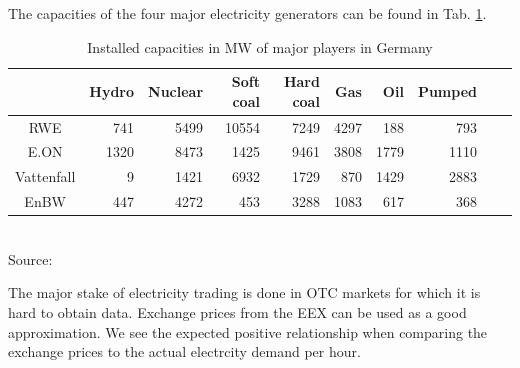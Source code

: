 The capacities of the four major electricity generators can be found in Tab. \ref{tab:majorcapacities}.

\begin{table}[htb]
\centering
\scriptsize
\caption{Installed capacities in MW of major players in Germany}

\begin{tabular}[htb]{crrrrrrrrr}
\hline
           &      Hydro &    Nuclear &  Soft coal &  Hard coal &        Gas &        Oil &     Pumped \\
\hline\hline
       RWE &        741 &       5499 &      10554 &       7249 &       4297 &        188 &        793 \\

      E.ON &       1320 &       8473 &       1425 &       9461 &       3808 &       1779 &       1110 \\

Vattenfall &          9 &       1421 &       6932 &       1729 &        870 &       1429 &       2883 \\

      EnBW &        447 &       4272 &        453 &       3288 &       1083 &        617 &        368 \\
\hline
\end{tabular} 
\label{tab:majorcapacities}
\\
\scriptsize Source: \cite{Ellersdorfer2005}
\end{table}



The major stake of electricity trading is done in OTC markets for which it is hard to obtain data. Exchange prices from the EEX can be used as a good approximation. We see the expected positive relationship when comparing the exchange prices to the actual electrcity demand per hour.


